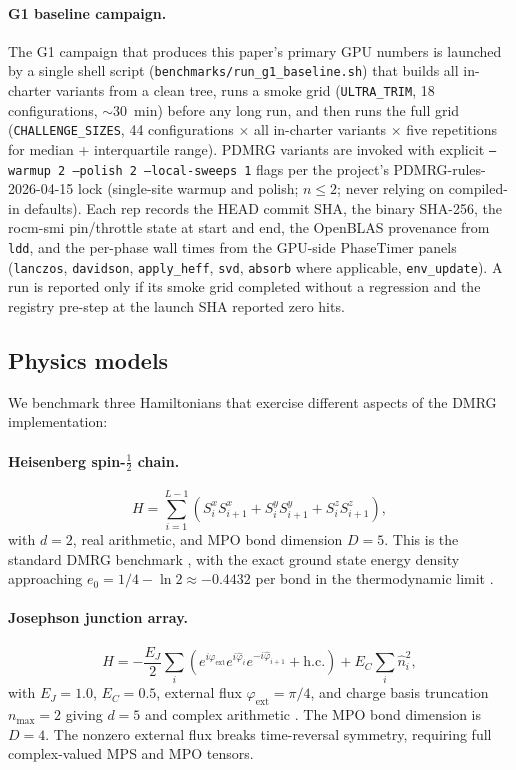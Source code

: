 \documentclass[preprint,12pt]{elsarticle}
\begin{document}
\paragraph{G1 baseline campaign.}
The G1 campaign that produces this paper's primary GPU numbers is launched by a single shell script (\texttt{benchmarks/run\_g1\_baseline.sh}) that builds all in-charter variants from a clean tree, runs a smoke grid (\texttt{ULTRA\_TRIM}, 18 configurations, $\sim$30~min) before any long run, and then runs the full grid (\texttt{CHALLENGE\_SIZES}, 44 configurations $\times$ all in-charter variants $\times$ five repetitions for median + interquartile range).
PDMRG variants are invoked with explicit \texttt{--warmup 2 --polish 2 --local-sweeps 1} flags per the project's PDMRG-rules-2026-04-15 lock (single-site warmup and polish; $n \le 2$; never relying on compiled-in defaults).
Each rep records the HEAD commit SHA, the binary SHA-256, the rocm-smi pin/throttle state at start and end, the OpenBLAS provenance from \texttt{ldd}, and the per-phase wall times from the GPU-side PhaseTimer panels (\texttt{lanczos}, \texttt{davidson}, \texttt{apply\_heff}, \texttt{svd}, \texttt{absorb} where applicable, \texttt{env\_update}).
A run is reported only if its smoke grid completed without a regression and the registry pre-step at the launch SHA reported zero hits.

\subsection{Physics models}
\label{sec:models}

We benchmark three Hamiltonians that exercise different aspects of the DMRG implementation:

\paragraph{Heisenberg spin-$\frac{1}{2}$ chain.}
\begin{equation}
  H = \sum_{i=1}^{L-1} \left( S^x_i S^x_{i+1} + S^y_i S^y_{i+1} + S^z_i S^z_{i+1} \right),
  \label{eq:heisenberg}
\end{equation}
with $d = 2$, real arithmetic, and MPO bond dimension $D = 5$.
This is the standard DMRG benchmark \cite{White1992}, with the exact ground state energy density approaching $e_0 = 1/4 - \ln 2 \approx -0.4432$ per bond in the thermodynamic limit \cite{Bethe1931}.

\paragraph{Josephson junction array.}
\begin{equation}
  H = -\frac{E_J}{2} \sum_{i} \left( e^{i\varphi_\text{ext}} e^{i\hat{\varphi}_i} e^{-i\hat{\varphi}_{i+1}} + \text{h.c.} \right) + E_C \sum_i \hat{n}_i^2,
  \label{eq:josephson}
\end{equation}
with $E_J = 1.0$, $E_C = 0.5$, external flux $\varphi_\text{ext} = \pi/4$, and charge basis truncation $n_\text{max} = 2$ giving $d = 5$ and complex arithmetic \cite{Fazio2001}.
The MPO bond dimension is $D = 4$.
The nonzero external flux breaks time-reversal symmetry, requiring full complex-valued MPS and MPO tensors.
\end{document}
